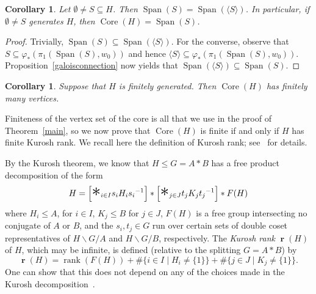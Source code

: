 \documentclass[11pt,reqno]{amsart}
\newtheorem{Cor}[Thm]{Corollary}
\begin{document}
\begin{Cor}\label{generates}
Let $\emptyset\neq S\subseteq H$.  Then ${\mathop{\mathrm{Span}}\nolimits}(S)={\mathop{\mathrm{Span}}\nolimits}(\langle S\rangle)$.  In particular, if $\emptyset\neq S$ generates $H$, then ${\mathop{\mathrm{Core}}\nolimits}(H)={\mathop{\mathrm{Span}}\nolimits}(S)$.
\end{Cor}
\begin{proof}
Trivially, ${\mathop{\mathrm{Span}}\nolimits}(S)\subseteq {\mathop{\mathrm{Span}}\nolimits}(\langle S\rangle)$.  For the converse, observe that $S\subseteq {\varphi}_*(\pi_1({\mathop{\mathrm{Span}}\nolimits}(S),w_0))$ and hence $\langle S\rangle \subseteq {\varphi}_*(\pi_1({\mathop{\mathrm{Span}}\nolimits}(S),w_0))$.  Proposition~\ref{galoisconnection} now yields that ${\mathop{\mathrm{Span}}\nolimits}(\langle S\rangle)\subseteq {\mathop{\mathrm{Span}}\nolimits}(S)$.
\end{proof}

\begin{Cor}\label{finitecorefg}
Suppose that $H$ is finitely generated.  Then ${\mathop{\mathrm{Core}}\nolimits}(H)$ has finitely many vertices.
\end{Cor}

Finiteness of the vertex set of the core is all that we use in the proof of Theorem~\ref{main}, so we now prove that ${\mathop{\mathrm{Core}}\nolimits}(H)$ is finite if and only if $H$ has finite Kurosh rank.  We recall here the definition of Kurosh rank; see~\cite{BurnsCompany,Ivanov,sykiotis} for details.

By the Kurosh theorem, we know that $H\leq G=A\ast B$ has a free product decomposition of the form
\begin{equation}\label{kuroshdecomp}
H=\left[{\mathop{\hbox{\huge $\ast$}}}_{i\in I}s_iH_is_i{^{-1}}\right]\ast\left[{\mathop{\hbox{\huge $\ast$}}}_{j\in J}t_jK_jt_j{^{-1}}\right]\ast F(H)
\end{equation}
where $H_i\leq A$, for $i\in I$, $K_j\leq B$ for $j\in J$, $F(H)$ is a free group intersecting no conjugate of $A$ or $B$, and the $s_i,t_j\in G$ run over certain sets of double coset representatives of $H\backslash G/A$ and $H\backslash G/B$, respectively.  The \emph{Kurosh rank} ${\mathop{\boldsymbol{r}}}(H)$ of $H$, which may be infinite, is defined (relative to the splitting $G=A\ast B$) by
\[{\mathop{\boldsymbol{r}}}(H) = {\mathop{\mathrm{rank}}}(F(H))+\#\{i\in I\mid H_i\neq \{1\}\}+\#\{j\in J\mid K_j\neq \{1\}\}.\]  One can show that this does not depend on any of the choices made in the Kurosh decomposition~\cite[Lemma~4]{Ivanov}.
\end{document}
